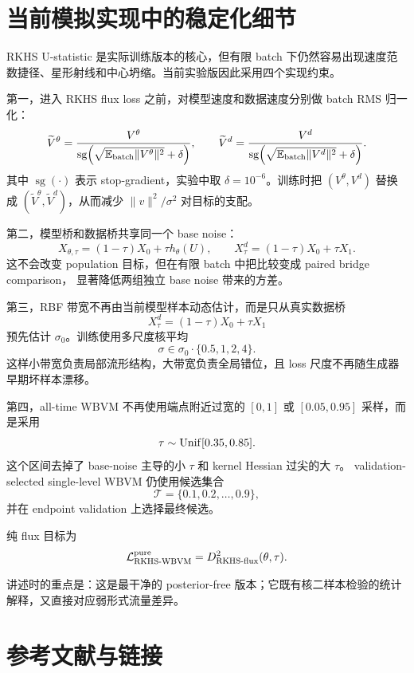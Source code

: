\documentclass[UTF8,11pt]{ctexart}
\newcommand{\E}{\mathbb{E}}
\newcommand{\cL}{\mathcal{L}}
\begin{document}
\section{当前模拟实现中的稳定化细节}

RKHS U-statistic 是实际训练版本的核心，但有限 batch 下仍然容易出现速度范数捷径、星形射线和中心坍缩。当前实验版因此采用四个实现约束。

第一，进入 RKHS flux loss 之前，对模型速度和数据速度分别做 batch RMS 归一化：
\[
\widetilde V^\theta
=
\frac{V^\theta}{
\operatorname{sg}\!\left(
\sqrt{\E_{\rm batch}\|V^\theta\|^2}+\delta
\right)},
\qquad
\widetilde V^d
=
\frac{V^d}{
\operatorname{sg}\!\left(
\sqrt{\E_{\rm batch}\|V^d\|^2}+\delta
\right)}.
\]
其中 \(\operatorname{sg}(\cdot)\) 表示 stop-gradient，实验中取 \(\delta=10^{-6}\)。训练时把
\((V^\theta,V^d)\) 替换成 \((\widetilde V^\theta,\widetilde V^d)\)，从而减少
\(\|v\|^2/\sigma^2\) 对目标的支配。

第二，模型桥和数据桥共享同一个 base noise：
\[
X_{\theta,\tau}=(1-\tau)X_0+\tau h_\theta(U),
\qquad
X^d_\tau=(1-\tau)X_0+\tau X_1 .
\]
这不会改变 population 目标，但在有限 batch 中把比较变成 paired bridge comparison，
显著降低两组独立 base noise 带来的方差。

第三，RBF 带宽不再由当前模型样本动态估计，而是只从真实数据桥
\[
X^d_\tau=(1-\tau)X_0+\tau X_1
\]
预先估计 \(\sigma_0\)。训练使用多尺度核平均
\[
\sigma\in \sigma_0\cdot\{0.5,1,2,4\}.
\]
这样小带宽负责局部流形结构，大带宽负责全局错位，且 loss 尺度不再随生成器早期坏样本漂移。

第四，all-time WBVM 不再使用端点附近过宽的 \([0,1]\) 或 \([0.05,0.95]\) 采样，而是采用
\[
\tau\sim{\rm Unif}[0.35,0.85].
\]
这个区间去掉了 base-noise 主导的小 \(\tau\) 和 kernel Hessian 过尖的大 \(\tau\)。
validation-selected single-level WBVM 仍使用候选集合
\[
\mathcal T=\{0.1,0.2,\ldots,0.9\},
\]
并在 endpoint validation 上选择最终候选。

纯 flux 目标为
\[
\cL_{\rm RKHS\text{-}WBVM}^{\rm pure}
=
D_{\rm RKHS\text{-}flux}^2(\theta,\tau).
\]

讲述时的重点是：这是最干净的 posterior-free 版本；它既有核二样本检验的统计解释，又直接对应弱形式流量差异。

\section{参考文献与链接}
\end{document}
